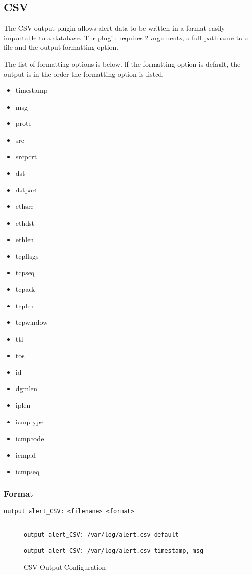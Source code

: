 \documentclass[english]{report}
\begin{document}
\subsection{CSV}

The CSV output plugin allows alert data to be written in a format
easily importable to a database. The plugin requires 2 arguments,
a full pathname to a file and the output formatting option. 

The list of formatting options is below. If the formatting option
is default, the output is in the order the formatting option is listed.

\begin{itemize}
\item timestamp
\item msg
\item proto
\item src
\item srcport
\item dst
\item dstport
\item ethsrc
\item ethdst
\item ethlen
\item tcpflags
\item tcpseq
\item tcpack
\item tcplen
\item tcpwindow
\item ttl
\item tos
\item id
\item dgmlen
\item iplen
\item icmptype
\item icmpcode
\item icmpid
\item icmpseq
\end{itemize}

\subsubsection{Format}

\begin{verbatim}
output alert_CSV: <filename> <format>


\end{verbatim}
%
\begin{figure}[!hbpt]
\begin{verbatim}
output alert_CSV: /var/log/alert.csv default

output alert_CSV: /var/log/alert.csv timestamp, msg
\end{verbatim}

\caption{CSV Output Configuration\label{csv output configuration}}
\end{figure}
\end{document}

